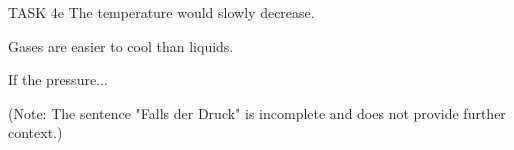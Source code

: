 TASK 4e  
The temperature would slowly decrease.  

Gases are easier to cool than liquids.  

If the pressure...  

(Note: The sentence "Falls der Druck" is incomplete and does not provide further context.)